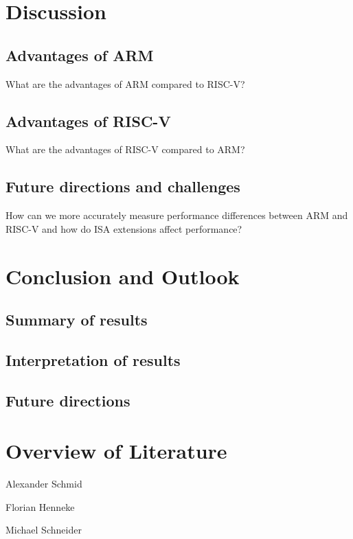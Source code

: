 \documentclass[conference]{IEEEtran}
\begin{document}
\section{Discussion}
\label{ref:discussion}
	\subsection{Advantages of ARM}
	What are the advantages of ARM compared to RISC-V?
	\subsection{Advantages of RISC-V}
	What are the advantages of RISC-V compared to ARM?
	\subsection{Future directions and challenges}
	How can we more accurately measure performance differences between ARM and RISC-V and how do ISA extensions affect performance?

\section{Conclusion and Outlook}
\label{ref:conclusion}
	\subsection{Summary of results}
	\subsection{Interpretation of results}
	\subsection{Future directions}

\section{Overview of Literature}
Alexander Schmid \cite{Akram2017} \cite{Arm2020} \cite{Asanovic2014} \cite{HeuiLee2001} \cite{Patterson2019} \cite{Perotti2020} \cite{Shore2015} \cite{Waterman2016} \cite{Xu2003}

Florian Henneke \cite{Waterman2016} \cite{Ryzhyk2006} \cite{Asanovic2014} \cite{Furber2000} \cite{Microsoft2020} \cite{Greenwaves2020} \cite{Aws2020} \cite{Microsoft2020}

Michael Schneider \cite{50years} \cite{hennessy2012computer} \cite{drechsler2020enhanced} \cite{WisconsinMadison2016} \cite{IEEE2018} \cite{Dirvin2019} \cite{Bandic2019}



\end{document}
